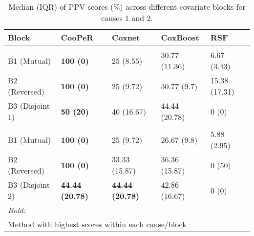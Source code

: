 \begin{table}
\centering
\caption{Median (IQR) of PPV scores (\%) across different covariate blocks for causes 1 and 2.\label{tab:ppv-median}}
\centering
\begin{tabular}[t]{lllll}
\toprule
Block & CooPeR & Coxnet & CoxBoost & RSF\\
\midrule
\addlinespace[0.3em]
\multicolumn{5}{l}{\textbf{Cause 1}}\\
\hspace{1em}B1 (Mutual) & \textbf{100 (0)} & 25 (8.55) & 30.77 (11.36) & 6.67 (3.43)\\
\hspace{1em}B2 (Reversed) & \textbf{100 (0)} & 25 (9.72) & 30.77 (9.7) & 15.38 (17.31)\\
\hspace{1em}B3 (Disjoint 1) & \textbf{50 (20)} & 40 (16.67) & 44.44 (20.78) & 0 (0)\\
\addlinespace[0.3em]
\multicolumn{5}{l}{\textbf{Cause 2}}\\
\hspace{1em}B1 (Mutual) & \textbf{100 (0)} & 25 (9.72) & 26.67 (9.8) & 5.88 (2.95)\\
\hspace{1em}B2 (Reversed) & \textbf{100 (0)} & 33.33 (15.87) & 36.36 (15.87) & 0 (50)\\
\hspace{1em}B3 (Disjoint 2) & \textbf{44.44 (20.78)} & \textbf{44.44 (20.78)} & 42.86 (16.67) & 0 (0)\\
\bottomrule
\multicolumn{5}{l}{\rule{0pt}{1em}\textit{Bold:}}\\
\multicolumn{5}{l}{\rule{0pt}{1em}Method with highest scores within each cause/block}\\
\end{tabular}
\end{table}
